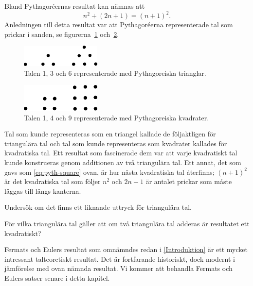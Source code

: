Bland Pythagoréernas resultat kan nämnas att
\begin{equation}
  \label{eq:pyth-square}
  n^2 + (2n + 1) = (n + 1)^2.
\end{equation}
Anledningen till detta resultat var att Pythagoréerna representerade tal som 
prickar i sanden, se figurerna~\ref{fig:pyth-triangles} 
och~\ref{fig:pyth-squares}.
\begin{figure}
  \centering
  \includegraphics[width=4cm]{figs/pyth-triangles.eps}
  \caption{%
    Talen 1, 3 och 6 representerade med Pythagoreiska trianglar.
  }\label{fig:pyth-triangles}
\end{figure}
\begin{figure}
  \centering
  \includegraphics[width=4cm]{figs/pyth-squares.eps}
  \caption{%
    Talen 1, 4 och 9 representerade med Pythagoreiska kvadrater.
  }\label{fig:pyth-squares}
\end{figure}
Tal som kunde representeras som en triangel kallade de följaktligen för 
triangulära tal och tal som kunde representeras som 
kvadrater kallades för kvadratiska tal.
Ett resultat som fascinerade dem var att varje kvadratiskt tal kunde 
konstrueras genom additionen av två triangulära tal.
Ett annat, det som gavs som \cref{eq:pyth-square} ovan, är hur nästa 
kvadratiska tal återfinns; \( (n+1)^2 \) är det kvadratiska tal som följer 
\(n^2\) och \(2n + 1\) är antalet prickar som måste läggas till längs kanterna.
\begin{exercise}
  Undersök om det finns ett liknande uttryck för triangulära tal.
\end{exercise}
\begin{exercise}
  För vilka triangulära tal gäller att om två triangulära tal adderas är 
  resultatet ett kvadratiskt?
\end{exercise}

Fermats och Eulers resultat som omnämndes redan i \cref{Introduktion} är ett 
mycket intressant talteoretiskt resultat.
Det är fortfarande historiskt, dock modernt i jämförelse med ovan nämnda 
resultat.
Vi kommer att behandla Fermats och Eulers satser senare i detta kapitel.

